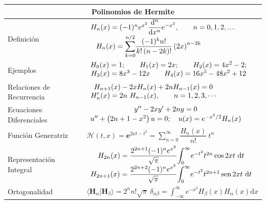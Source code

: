 \documentclass[spanish,notitlepage,letterpaper,12pt]{article}
\begin{document}
\begin{center}
\begin{tabular}
[c]{|l|l|}\hline
\multicolumn{2}{|c|}{\textbf{Polinomios de Hermite}}\\\hline
Definici\'{o}n & $%
\begin{array}
[c]{c}%
H_{n}(x)=(-1)^{n}e^{x^{2}}\dfrac{\mathrm{d}^{n}}{\mathrm{d}x^{n}}e^{-x^{2}%
},\qquad n=0,1,2,....\\
H_{n}(x)=%
{\displaystyle\sum_{k=0}^{n/2}}
\dfrac{(-1)^{k}n!}{k!\left(  n-2k\right)  !}\left(  2x\right)  ^{n-2k}%
\qquad\qquad
\end{array}
$\\\hline
Ejemplos & $%
\begin{array}
[c]{c}%
H_{0}(x)=1;\qquad H_{1}(x)=2x;\qquad H_{2}(x)=4x^{2}-2;\\
H_{3}(x)=8x^{3}-12x\qquad H_{4}(x)=16x^{5}-48x^{2}+12
\end{array}
$\\\hline
Relaciones de Recurrencia & $%
\begin{array}
[c]{c}%
H_{n+1}(x)-2xH_{n}(x)+2nH_{n-1}(x)=0\\
H_{n}^{\prime}(x)=2n\ H_{n-1}(x),\qquad n=1,2,3,\cdots
\end{array}
$\\\hline
Ecuaciones Diferenciales & $%
\begin{array}
[c]{c}%
y^{\prime\prime}-2xy^{\prime}+2ny=0\\
u^{\prime\prime}+\left(  2n+1-x^{2}\right)  u=0;\quad u(x)=e^{-x^{2}/2}%
H_{n}(x)
\end{array}
$\\\hline
Funci\'{o}n Generatriz & $\mathcal{H}(t,x)=\mathbf{e}^{2xt-t^{2}}=%
{\displaystyle\sum_{n=0}^{\infty}}
\dfrac{H_{n}(x)}{n!}\ t^{n}$\\\hline
Representaci\'{o}n Integral & $%
\begin{array}
[c]{c}%
H_{2n}(x)=\dfrac{2^{2n+1}(-1)^{n}e^{x^{2}}}{\sqrt{\pi}}%
{\displaystyle\int_{0}^{\infty}}
e^{-t^{2}}t^{2n}\cos2xt\ \mathrm{d}t\\
H_{2n+1}(x)=\dfrac{2^{2n+2}(-1)^{n}e^{x^{2}}}{\sqrt{\pi}}%
{\displaystyle\int_{0}^{\infty}}
e^{-t^{2}}t^{2n+1}\operatorname*{sen}2xt\ \mathrm{d}t
\end{array}
$\\\hline
Ortogonalidad & $\langle\mathbf{H}_{\alpha}|\mathbf{H}_{\beta}\rangle
=2^{n}n!\sqrt{\pi}\ \delta_{\alpha\beta}=%
{\displaystyle\int_{-\infty}^{\infty}}
e^{-x^{2}}H_{\beta}(x)H_{\alpha}(x)\mathrm{d}x$\\\hline
\end{tabular}%


\end{center}
\end{document}
